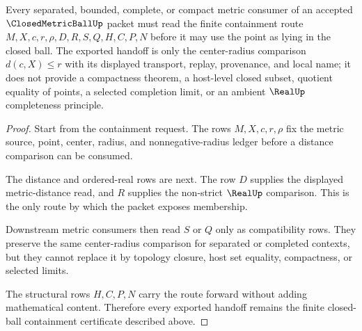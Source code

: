 \begin{theorem}
\label{thm:closed-metric-ball-containment-handoff}
Every separated, bounded, complete, or compact metric consumer of an accepted $\ClosedMetricBallUp$ packet must read the finite containment route $M,X,c,r,\rho,D,R,S,Q,H,C,P,N$ before it may use the point as lying in the closed ball. The exported handoff is only the center-radius comparison $d(c,X)\leq r$ with its displayed transport, replay, provenance, and local name; it does not provide a compactness theorem, a host-level closed subset, quotient equality of points, a selected completion limit, or an ambient $\RealUp$ completeness principle.
\end{theorem}
\begin{proof}
Start from the containment request. The rows $M,X,c,r,\rho$ fix the metric source, point, center, radius, and nonnegative-radius ledger before a distance comparison can be consumed.

The distance and ordered-real rows are next. The row $D$ supplies the displayed metric-distance read, and $R$ supplies the non-strict $\RealUp$ comparison. This is the only route by which the packet exposes membership.

Downstream metric consumers then read $S$ or $Q$ only as compatibility rows. They preserve the same center-radius comparison for separated or completed contexts, but they cannot replace it by topology closure, host set equality, compactness, or selected limits.

The structural rows $H,C,P,N$ carry the route forward without adding mathematical content. Therefore every exported handoff remains the finite closed-ball containment certificate described above.
\end{proof}



